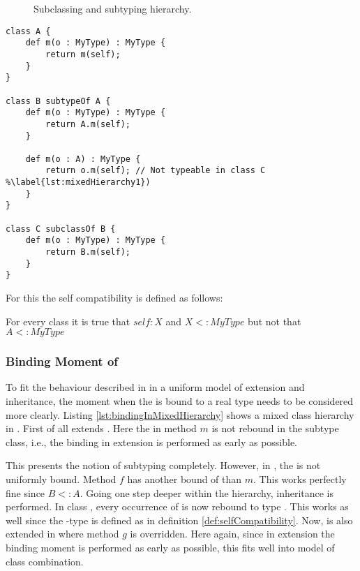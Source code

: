 \begin{figure}[ht]
	\centering
	\caption{Subclassing and subtyping hierarchy.}
	\label{fig:hierarchy}
\end{figure}

\begin{lstlisting}[float=ht,language=ooplss,caption=Mixed extension and inheritance hierarchy.,label=lst:mixedHierarchy]
class A {
	def m(o : MyType) : MyType {
		return m(self);
	}
}

class B subtypeOf A {
	def m(o : MyType) : MyType {
		return A.m(self);
	}

	def m(o : A) : MyType {
		return o.m(self); // Not typeable in class C %\label{lst:mixedHierarchy1})
	}
}

class C subclassOf B {
	def m(o : MyType) : MyType {
		return B.m(self);
	}
}
\end{lstlisting}

For this the self compatibility is defined as follows:

\begin{defn}
	\label{def:selfCompatibility}
	For every class \A it is true that $self : X$ and $X <: MyType$ but not that $A <: MyType$
\end{defn}

\subsubsection{Binding Moment of \mytype}
To fit the behaviour described in  in a
uniform model of extension and inheritance, the moment when the \mytype is
bound to a real type needs to be considered more clearly. Listing
\ref{lst:bindingInMixedHierarchy} shows a mixed class hierarchy in
\ooplss. First of all \B extends \A. Here the \mytype in method $m$ is
not rebound in the subtype class, i.e., the \mytype binding in extension
is performed as early as possible.

This presents the notion of subtyping completely. However, in \B, the \mytype
is not uniformly bound. Method $f$ has another bound of \mytype than
$m$. This works perfectly fine since $B <: A$. Going one step deeper within
the hierarchy, inheritance is performed. In class \C, every occurrence
of \mytype is now rebound to type \C. This works as well since the
\self-type is defined as in definition \ref{def:selfCompatibility}. Now,
\C is also extended in \D where method $g$ is overridden. Here again,
since in extension the binding moment is performed as early as possible,
this fits well into \ooplsss model of class combination.

